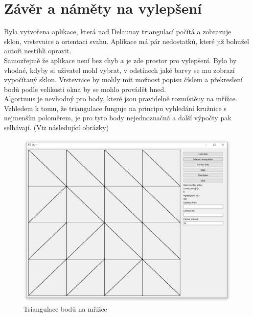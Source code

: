 \documentclass{article}
\begin{document}
\section{Závěr a náměty na vylepšení}
Byla vytvořena aplikace, která nad Delaunay triangulací počítá a zobrazuje sklon, vrstevnice a orientaci svahu. Aplikace má pár nedostatků, které již bohužel autoři nestihli opravit. \\
\indent Samozřejmě že aplikace není bez chyb a je zde prostor pro vylepšení. Bylo by vhodné, kdyby si uživatel mohl vybrat, v odstínech jaké barvy se mu zobrazí vypočítaný sklon. Vrstevnice by mohly mít možnost popisu číslem a překreslení bodů podle velikosti okna by se mohlo provádět hned. \\
\indent Algortmus je nevhodný pro body, které jsou pravidelně rozmístěny na mřížce. Vzhledem k tomu, že triangulace funguje na principu vyhledání kružnice s nejmenším poloměrem, je pro tyto body nejednoznačná a další výpočty pak selhávají. (Viz následující obrázky)
\begin{figure}[hb]
\centering
        \includegraphics[trim=0cm 0cm 0cm 0cm, width=1\textwidth]{grid_dt.jpg}
        \caption{Triangulace bodů na mřížce}
\end{figure}
\end{document}
